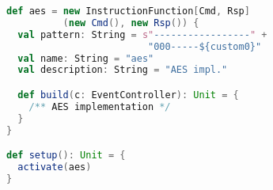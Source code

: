\begin{lstlisting}[language=scala]
def aes = new InstructionFunction[Cmd, Rsp]
          (new Cmd(), new Rsp()) {
  val pattern: String = s"-----------------" +
                         "000-----${custom0}"
  val name: String = "aes"
  val description: String = "AES impl."

  def build(c: EventController): Unit = {
    /** AES implementation */
  }
}

def setup(): Unit = {
  activate(aes)
}
\end{lstlisting}
